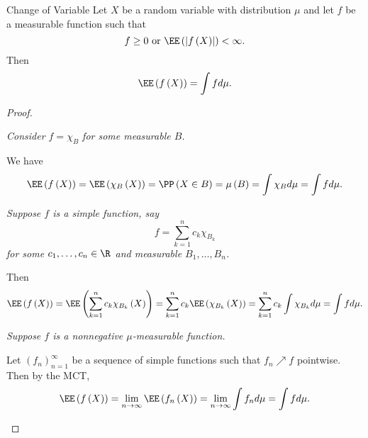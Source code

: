 \documentclass[stat901]{subfiles}
\begin{document}
    \rruleline

    \begin{theorem}{Change of Variable}
        Let $X$ be a random variable with distribution $\mu$ and let $f$ be a measurable function such that
        \begin{equation*}
            f\geq 0 \text{ or } \EE\left( \left| f\left( X \right) \right| \right) < \infty.
        \end{equation*}
        Then
        \begin{equation*}
            \EE\left( f\left( X \right) \right) = \int fd\mu.
        \end{equation*}
    \end{theorem}

    \begin{proof}
        \begin{case}
            \textit{Consider $f=\chi_B$ for some measurable $B$.}

            We have
            \begin{equation*}
                \EE\left( f\left( X \right) \right) = \EE\left( \chi_B\left( X \right) \right) = \PP\left( X\in B \right) = \mu\left( B \right) = \int\chi_Bd\mu = \int fd\mu.
            \end{equation*}
        \end{case}

        \begin{case}
            \textit{Suppose $f$ is a simple function, say
                \begin{equation*}
                    f = \sum^{n}_{k=1}c_k\chi_{B_k}
                \end{equation*}
                for some $c_1,\ldots,c_n\in\R$ and measurable $B_1,\ldots,B_n$.
            }

            Then
            \begin{equation*}
                \EE\left( f\left( X \right) \right) = \EE\left( \sum^{n}_{k=1}c_k\chi_{B_k}\left( X \right) \right) = \sum^{n}_{k=1} c_k\EE\left( \chi_{B_k}\left( X \right) \right) = \sum^{n}_{k=1}c_k\int\chi_{B_k}d\mu = \int fd\mu.
            \end{equation*}
        \end{case}

        \begin{case}
            \textit{Suppose $f$ is a nonnegative $\mu$-measurable function.}

            Let $\left( f_{n} \right)^{\infty}_{n=1}$ be a sequence of simple functions such that $f_n\nearrow f$ pointwise. Then by the MCT,
            \begin{equation*}
                \EE\left( f\left( X \right) \right) = \lim_{n\to\infty} \EE\left( f_n\left( X \right) \right) = \lim_{n\to\infty}\int f_nd\mu = \int fd\mu.
            \end{equation*}
        \end{case}


\end{proof}
\end{document}
